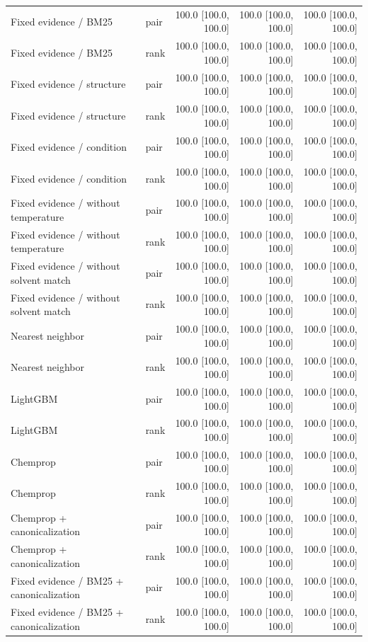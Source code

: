 \begin{longtable}{p{.26\linewidth}lrrr}
Fixed evidence / BM25 & pair & 100.0 [100.0, 100.0] & 100.0 [100.0, 100.0] & 100.0 [100.0, 100.0] \\
Fixed evidence / BM25 & rank & 100.0 [100.0, 100.0] & 100.0 [100.0, 100.0] & 100.0 [100.0, 100.0] \\
Fixed evidence / structure & pair & 100.0 [100.0, 100.0] & 100.0 [100.0, 100.0] & 100.0 [100.0, 100.0] \\
Fixed evidence / structure & rank & 100.0 [100.0, 100.0] & 100.0 [100.0, 100.0] & 100.0 [100.0, 100.0] \\
Fixed evidence / condition & pair & 100.0 [100.0, 100.0] & 100.0 [100.0, 100.0] & 100.0 [100.0, 100.0] \\
Fixed evidence / condition & rank & 100.0 [100.0, 100.0] & 100.0 [100.0, 100.0] & 100.0 [100.0, 100.0] \\
Fixed evidence / without temperature & pair & 100.0 [100.0, 100.0] & 100.0 [100.0, 100.0] & 100.0 [100.0, 100.0] \\
Fixed evidence / without temperature & rank & 100.0 [100.0, 100.0] & 100.0 [100.0, 100.0] & 100.0 [100.0, 100.0] \\
Fixed evidence / without solvent match & pair & 100.0 [100.0, 100.0] & 100.0 [100.0, 100.0] & 100.0 [100.0, 100.0] \\
Fixed evidence / without solvent match & rank & 100.0 [100.0, 100.0] & 100.0 [100.0, 100.0] & 100.0 [100.0, 100.0] \\
Nearest neighbor & pair & 100.0 [100.0, 100.0] & 100.0 [100.0, 100.0] & 100.0 [100.0, 100.0] \\
Nearest neighbor & rank & 100.0 [100.0, 100.0] & 100.0 [100.0, 100.0] & 100.0 [100.0, 100.0] \\
LightGBM & pair & 100.0 [100.0, 100.0] & 100.0 [100.0, 100.0] & 100.0 [100.0, 100.0] \\
LightGBM & rank & 100.0 [100.0, 100.0] & 100.0 [100.0, 100.0] & 100.0 [100.0, 100.0] \\
Chemprop & pair & 100.0 [100.0, 100.0] & 100.0 [100.0, 100.0] & 100.0 [100.0, 100.0] \\
Chemprop & rank & 100.0 [100.0, 100.0] & 100.0 [100.0, 100.0] & 100.0 [100.0, 100.0] \\
Chemprop + canonicalization & pair & 100.0 [100.0, 100.0] & 100.0 [100.0, 100.0] & 100.0 [100.0, 100.0] \\
Chemprop + canonicalization & rank & 100.0 [100.0, 100.0] & 100.0 [100.0, 100.0] & 100.0 [100.0, 100.0] \\
Fixed evidence / BM25 + canonicalization & pair & 100.0 [100.0, 100.0] & 100.0 [100.0, 100.0] & 100.0 [100.0, 100.0] \\
Fixed evidence / BM25 + canonicalization & rank & 100.0 [100.0, 100.0] & 100.0 [100.0, 100.0] & 100.0 [100.0, 100.0] \\
\bottomrule
\end{longtable}
\endgroup
